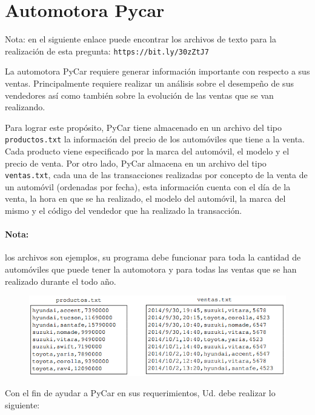 \section{Automotora Pycar}

Nota: en el siguiente enlace puede encontrar los archivos de texto para la realización de esta pregunta: \texttt{https://bit.ly/30zZtJ7}

La automotora PyCar requiere generar información importante con respecto a sus ventas.
Principalmente requiere realizar un análisis sobre el desempeño de sus vendedores así como también sobre la evolución de las ventas que se van realizando.

Para lograr este propósito, PyCar tiene almacenado en un archivo del tipo \texttt{productos.txt} la información del precio de los automóviles que tiene a la venta. Cada producto viene especificado por la marca del automóvil, el modelo y el precio de venta. Por otro lado, PyCar almacena en un archivo del tipo \texttt{ventas.txt}, cada una de las transacciones realizadas por concepto de la venta
de un automóvil (ordenadas por fecha), esta información cuenta con el día de la venta, la hora en que se ha realizado, el modelo del automóvil, la marca del mismo y el código del vendedor que ha realizado la transacción. 

\paragraph{Nota:} los archivos son ejemplos, su programa debe funcionar para toda la cantidad de automóviles que puede tener la automotora y para todas las ventas que se han realizado durante el todo año.

\begin{figure}
    \centering
    \includegraphics[scale=0.8]{Imagenes/autos.png}
\end{figure}

Con el fin de ayudar a PyCar en sus requerimientos, Ud. debe realizar lo siguiente:

